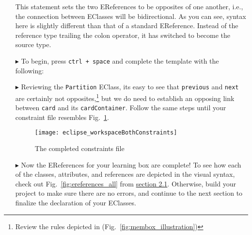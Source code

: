 \begin{itemize}
This statement sets the two EReferences to be opposites of one another, i.e., the connection between EClasses will be bidirectional. As you can see, syntax here
is slightly different than that of a standard EReference. Instead of the reference type trailing the colon operator, it has switched to become the source type.

\vspace{0.5cm}

\item[$\blacktriangleright$] To begin, press \texttt{ctrl + space} and complete the template with the following:


\item[$\blacktriangleright$] Reviewing the \texttt{Partition} EClass, its easy to see that \texttt{previous} and \texttt{next} are certainly not
opposites,\footnote{Review the rules depicted in (Fig.~\ref{fig:membox_illustration})} but we do need to establish an opposing link between
\texttt{card} and its \texttt{cardContainer}. Follow the same steps until your constraint file resembles Fig.~\ref{fig:bothConstraints}.

\begin{figure}[htbp]
	\centering
  \texttt{[image: eclipse\_workspaceBothConstraints]}
	\caption{The completed constraints file}
	\label{fig:bothConstraints}
\end{figure} 

\newpage

\item[$\blacktriangleright$] Now the EReferences for your learning box are complete! To see how each of the classes, attributes, and references
are depicted in the visual syntax, check out Fig.~\ref{fig:ereferences_all} from \hyperlink{sec:static vis}{section 2.1}. Otherwise, build your project to
make sure there are no errors, and continue to the next section to finalize the declaration of your EClasses.


\end{itemize}
